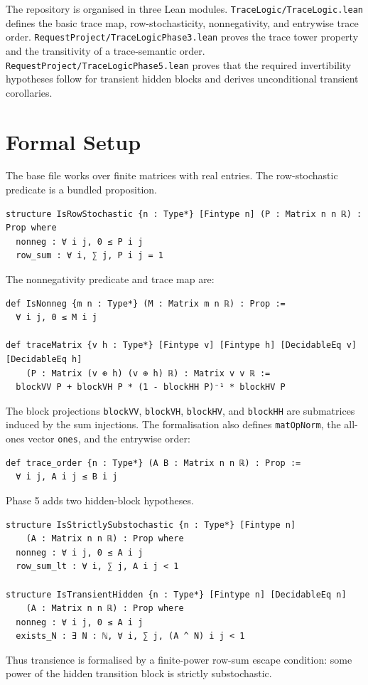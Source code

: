 \documentclass[11pt]{article}
\begin{document}
The repository is organised in three Lean modules.
\texttt{TraceLogic/TraceLogic.lean} defines the basic trace map, row-stochasticity, nonnegativity, and entrywise trace order.
\texttt{RequestProject/TraceLogicPhase3.lean} proves the trace tower property and the transitivity of a trace-semantic order.
\texttt{RequestProject/TraceLogicPhase5.lean} proves that the required invertibility hypotheses follow for transient hidden blocks and derives unconditional transient corollaries.

\section{Formal Setup}

The base file works over finite matrices with real entries.
The row-stochastic predicate is a bundled proposition.
\begin{lstlisting}[style=lean]
structure IsRowStochastic {n : Type*} [Fintype n] (P : Matrix n n ℝ) : Prop where
  nonneg : ∀ i j, 0 ≤ P i j
  row_sum : ∀ i, ∑ j, P i j = 1
\end{lstlisting}

The nonnegativity predicate and trace map are:
\begin{lstlisting}[style=lean]
def IsNonneg {m n : Type*} (M : Matrix m n ℝ) : Prop :=
  ∀ i j, 0 ≤ M i j

def traceMatrix {v h : Type*} [Fintype v] [Fintype h] [DecidableEq v] [DecidableEq h]
    (P : Matrix (v ⊕ h) (v ⊕ h) ℝ) : Matrix v v ℝ :=
  blockVV P + blockVH P * (1 - blockHH P)⁻¹ * blockHV P
\end{lstlisting}
The block projections \texttt{blockVV}, \texttt{blockVH}, \texttt{blockHV}, and \texttt{blockHH} are submatrices induced by the sum injections.
The formalisation also defines \texttt{matOpNorm}, the all-ones vector \texttt{ones}, and the entrywise order:
\begin{lstlisting}[style=lean]
def trace_order {n : Type*} (A B : Matrix n n ℝ) : Prop :=
  ∀ i j, A i j ≤ B i j
\end{lstlisting}

Phase 5 adds two hidden-block hypotheses.
\begin{lstlisting}[style=lean]
structure IsStrictlySubstochastic {n : Type*} [Fintype n]
    (A : Matrix n n ℝ) : Prop where
  nonneg : ∀ i j, 0 ≤ A i j
  row_sum_lt : ∀ i, ∑ j, A i j < 1

structure IsTransientHidden {n : Type*} [Fintype n] [DecidableEq n]
    (A : Matrix n n ℝ) : Prop where
  nonneg : ∀ i j, 0 ≤ A i j
  exists_N : ∃ N : ℕ, ∀ i, ∑ j, (A ^ N) i j < 1
\end{lstlisting}
Thus transience is formalised by a finite-power row-sum escape condition: some power of the hidden transition block is strictly substochastic.
\end{document}
